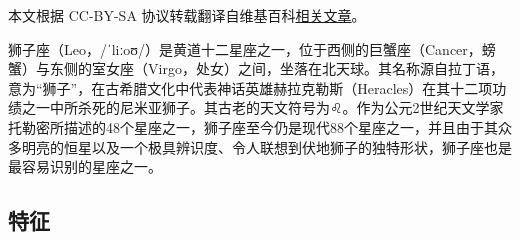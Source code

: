 
本文根据 CC-BY-SA 协议转载翻译自维基百科\href{https://en.wikipedia.org/wiki/Leo_(constellation)}{相关文章}。

狮子座（Leo，/ˈliːoʊ/）是黄道十二星座之一，位于西侧的巨蟹座（Cancer，螃蟹）与东侧的室女座（Virgo，处女）之间，坐落在北天球。其名称源自拉丁语，意为“狮子”，在古希腊文化中代表神话英雄赫拉克勒斯（Heracles）在其十二项功绩之一中所杀死的尼米亚狮子。其古老的天文符号为♌︎。作为公元2世纪天文学家托勒密所描述的48个星座之一，狮子座至今仍是现代88个星座之一，并且由于其众多明亮的恒星以及一个极具辨识度、令人联想到伏地狮子的独特形状，狮子座也是最容易识别的星座之一。

\subsection{特征}


